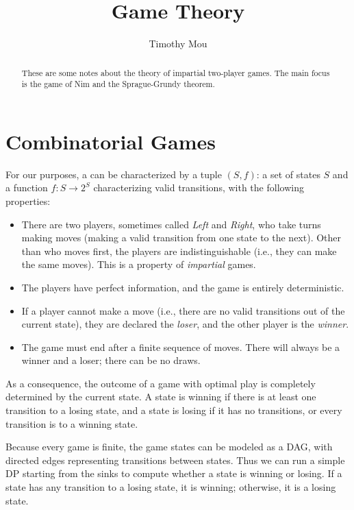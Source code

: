 \documentclass[11pt]{scrartcl}
\begin{document}
\title{Game Theory}
\author{Timothy Mou}
\maketitle

\tableofcontents

\begin{abstract}
  These are some notes about the theory of impartial two-player games.
  The main focus is the game of Nim and the Sprague-Grundy theorem.
\end{abstract}

\section{Combinatorial Games}

\begin{definition}
  For our purposes, a  can be characterized by a tuple $(S, f)$: a set of states $S$ and a function $f : S \to 2^S$ characterizing valid transitions, with the following properties:
  \begin{itemize}
    \item There are two players, sometimes called \textit{Left} and \textit{Right}, who take turns making moves (making a valid transition from one state to the next).
    Other than who moves first, the players are indistinguishable (i.e., they can make the same moves).
      This is a property of \textit{impartial} games.
   \item The players have perfect information, and the game is entirely deterministic.
   \item If a player cannot make a move (i.e., there are no valid transitions out of the current state), they are declared the \textit{loser}, and the other player is the \textit{winner}.
    \item The game must end after a finite sequence of moves.
      There will always be a winner and a loser; there can be no draws.
  \end{itemize}

  As a consequence, the outcome of a game with optimal play is completely determined by the current state.
  A state is winning if there is at least one transition to a losing state, and a state is losing if it has no transitions, or every transition is to a winning state.

  Because every game is finite, the game states can be modeled as a DAG, with directed edges representing transitions between states.
  Thus we can run a simple DP starting from the sinks to compute whether a state is winning or losing.
  If a state has any transition to a losing state, it is winning; otherwise, it is a losing state.


\end{definition}
\end{document}
